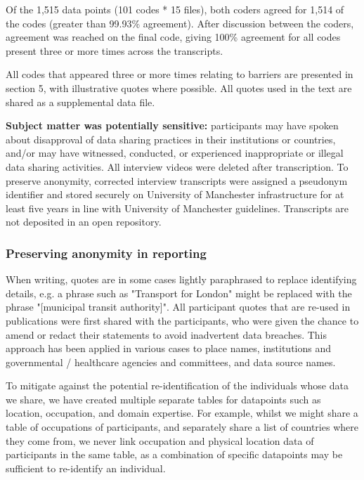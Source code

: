 \documentclass{CUP-JNL-DAP}%
\begin{document}
Of the 1,515 data points (101 codes * 15 files), both coders agreed for 1,514 of the codes (greater than 99.93\% agreement). After discussion between the coders, agreement was reached on the final code, giving 100\% agreement for all codes present three or more times across the transcripts. 

All codes that appeared three or more times relating to barriers are presented in section 5, with illustrative quotes where possible. All quotes used in the text are shared as a supplemental data file. 

\textbf{Subject matter was potentially sensitive:} participants may have spoken about disapproval of data sharing practices in their institutions or countries, and/or may have witnessed, conducted, or experienced inappropriate or illegal data sharing activities. All interview videos were deleted after transcription. To preserve anonymity, corrected interview transcripts were assigned a pseudonym identifier and stored securely on University of Manchester infrastructure for at least five years in line with University of Manchester guidelines. Transcripts are not deposited in an open repository. 

\subsubsection{Preserving anonymity in reporting}
When writing, quotes are in some cases lightly paraphrased to replace identifying details, e.g. a phrase such as "Transport for London" might be replaced with the phrase "[municipal transit authority]". All participant quotes that are re-used in publications were first shared with the participants, who were given the chance to amend or redact their statements to avoid inadvertent data breaches. This approach has been applied in various cases to place names, institutions and governmental / healthcare agencies and committees, and data source names. 

To mitigate against the potential re-identification of the individuals whose data we share, we have created multiple separate tables for datapoints such as location, occupation, and domain expertise. For example, whilst we might share a table of occupations of participants, and separately share a list of countries where they come from, we never link occupation and physical location data of participants in the same table, as a combination of specific datapoints may be sufficient to re-identify an individual.
\end{document}
